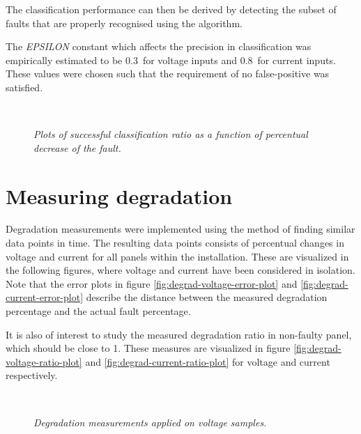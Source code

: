 The classification performance can then be derived by detecting the subset of faults that are properly recognised using the algorithm.

The \emph{EPSILON} constant which affects the precision in classification was empirically estimated to be $0.3$ for voltage inputs and $0.8$ for current inputs.
These values were chosen such that the requirement of no false-positive was satisfied.

\begin{figure}[here]
\centering
{}
~
\caption[Immediate failure detection performance]{\emph{
   Plots of successful classification ratio as a function of percentual decrease of the fault.
}}
\end{figure}

\clearpage
\section{Measuring degradation}
Degradation measurements were implemented using the method of finding similar data points in time.
The resulting data points consists of percentual changes in voltage and current for all panels within the installation.
These are visualized in the following figures, where voltage and current have been considered in isolation.
Note that the error plots in figure \ref{fig:degrad-voltage-error-plot} and \ref{fig:degrad-current-error-plot} describe the distance between the measured degradation percentage and the actual fault percentage.

It is also of interest to study the measured degradation ratio in non-faulty panel, which should be close to 1.
These measures are visualized in figure \ref{fig:degrad-voltage-ratio-plot} and \ref{fig:degrad-current-ratio-plot} for voltage and current respectively.

\begin{figure}[here]
\centering
{}
~
\caption[Performance of distance-based method (voltage)]{\emph{Degradation measurements applied on voltage samples.}}
\end{figure}

